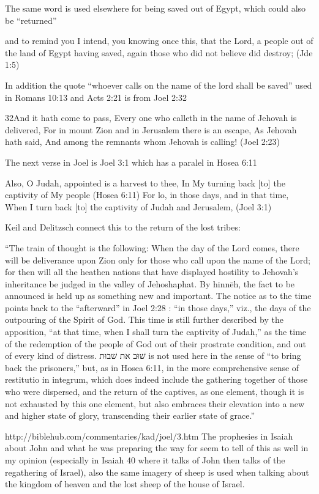 \documentclass[11pt]{article}
\begin{document}
The same word is used elsewhere for being saved out of Egypt, which could also be “returned”

and to remind you I intend, you knowing once this, that the Lord, a people out of the land of Egypt having saved, again those who did not believe did destroy; (Jde 1:5)

In addition the quote “whoever calls on the name of the lord shall be saved” used in Romans 10:13 and Acts 2:21 is from Joel 2:32


32And it hath come to pass, Every one who calleth in the name of Jehovah is delivered, For in mount Zion and in Jerusalem there is an escape, As Jehovah hath said, And among the remnants whom Jehovah is calling! (Joel 2:23)

The next verse in Joel is Joel 3:1 which has a paralel in Hosea 6:11

Also, O Judah, appointed is a harvest to thee, In My turning back [to] the captivity of My people (Hosea 6:11)
For lo, in those days, and in that time, When I turn back [to] the captivity of Judah and Jerusalem, (Joel 3:1)

Keil and Delitzsch connect this to the return of the lost tribes:


“The train of thought is the following: When the day of the Lord comes, there will be deliverance upon Zion only for those who call upon the name of the Lord; for then will all the heathen nations that have displayed hostility to Jehovah’s inheritance be judged in the valley of Jehoshaphat. By hinnēh, the fact to be announced is held up as something new and important. The notice as to the time points back to the “afterward” in Joel 2:28 : “in those days,” viz., the days of the outpouring of the Spirit of God. This time is still further described by the apposition, “at that time, when I shall turn the captivity of Judah,” as the time of the redemption of the people of God out of their prostrate condition, and out of every kind of distress. שׁוּב את שׁבוּת is not used here in the sense of “to bring back the prisoners,” but, as in Hosea 6:11, in the more comprehensive sense of restitutio in integrum, which does indeed include the gathering together of those who were dispersed, and the return of the captives, as one element, though it is not exhausted by this one element, but also embraces their elevation into a new and higher state of glory, transcending their earlier state of grace.”

http://biblehub.com/commentaries/kad/joel/3.htm
The prophesies in Isaiah about John and what he was preparing the way
for seem to tell of this as well in my opinion (especially in Isaiah
40 where it talks of John then talks of the regathering of Israel),
also the same imagery of sheep is used when talking about the kingdom
of heaven and the lost sheep of the house of Israel.
\end{document}
